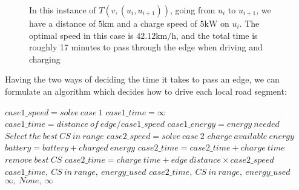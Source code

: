 \begin{figure}[!htb]
\label{fig:graph}
% 
\caption{In this instance of $T(v,(u_i, u_{i+1}))$, going from $u_i$ to $u_{i+1}$, we have a distance of $5 \si{\km}$ and a charge speed of $5 \si{\kW}$ on $u_i$. The optimal speed in this case is $42.12\si{\km\per\hour}$, and the total time is roughly 17 minutes to pass through the edge when driving and charging}
\end{figure}
Having the two ways of deciding the time it takes to pass an edge, we can formulate an algorithm which decides how to drive each local road segment:
\begin{algorithmic}[1]
	\State $case1\_speed = solve\:case\:1$
		\State $case1\_time = \infty$
	\Else
		\State $case1\_time = distance\:of\:edge / case1\_speed$
		\State $case1\_energy = energy\:needed$
	\EndIf
		\State $Select\: the\: best\: CS\: in\: range$
		\State $case2\_speed = solve\: case\: 2$		
			\State$charge\:available\:energy$
		\Else{}
		\EndIf
		\State $battery = battery + charged\: energy$
		\State $case2\_time = case2\_time + charge\: time$
			\State $remove\: best\: CS$
		\EndIf	
	\EndWhile
		\State $case2\_time = charge\: time + edge\: distance \times case2\_speed$
	\EndIf
		\State \Return $case1\_time,\: CS\: in\: range,\: energy\_used$
		\State \Return $case2\_time,\: CS\: in\: range,\: energy\_used$
		\State \Return $\infty,\:None,\:\infty$
	\EndIf
\EndFunction
\end{algorithmic}\label{alg:fastest_path}

